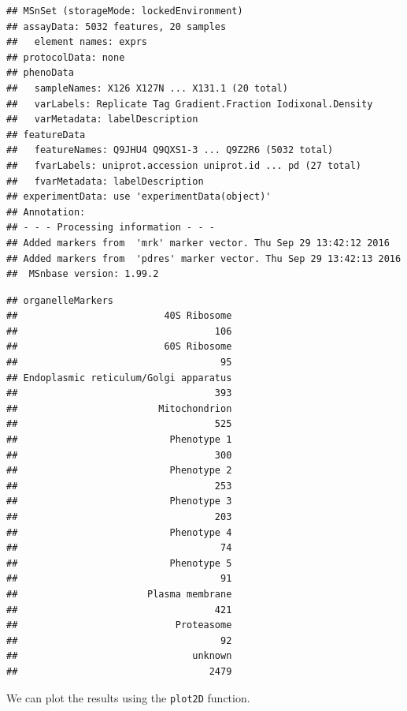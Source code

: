 \begin{verbatim}
## MSnSet (storageMode: lockedEnvironment)
## assayData: 5032 features, 20 samples 
##   element names: exprs 
## protocolData: none
## phenoData
##   sampleNames: X126 X127N ... X131.1 (20 total)
##   varLabels: Replicate Tag Gradient.Fraction Iodixonal.Density
##   varMetadata: labelDescription
## featureData
##   featureNames: Q9JHU4 Q9QXS1-3 ... Q9Z2R6 (5032 total)
##   fvarLabels: uniprot.accession uniprot.id ... pd (27 total)
##   fvarMetadata: labelDescription
## experimentData: use 'experimentData(object)'
## Annotation:  
## - - - Processing information - - -
## Added markers from  'mrk' marker vector. Thu Sep 29 13:42:12 2016 
## Added markers from  'pdres' marker vector. Thu Sep 29 13:42:13 2016 
##  MSnbase version: 1.99.2
\end{verbatim}

\begin{Shaded}
\begin{Highlighting}[]
 \NormalTok{)}
\end{Highlighting}
\end{Shaded}

\begin{verbatim}
## organelleMarkers
##                          40S Ribosome 
##                                   106 
##                          60S Ribosome 
##                                    95 
## Endoplasmic reticulum/Golgi apparatus 
##                                   393 
##                         Mitochondrion 
##                                   525 
##                           Phenotype 1 
##                                   300 
##                           Phenotype 2 
##                                   253 
##                           Phenotype 3 
##                                   203 
##                           Phenotype 4 
##                                    74 
##                           Phenotype 5 
##                                    91 
##                       Plasma membrane 
##                                   421 
##                            Proteasome 
##                                    92 
##                               unknown 
##                                  2479
\end{verbatim}

We can plot the results using the \texttt{plot2D} function.

